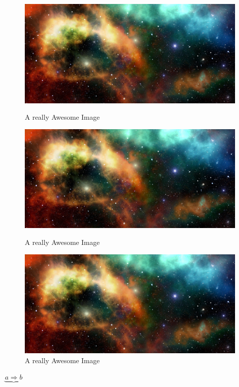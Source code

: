 \documentclass[a4paper,twoside]{report}
\begin{document}
\begin{figure}[!htb]
  \includegraphics[width=\linewidth]{Rplot}
  \caption{A really Awesome Image}\label{fig:awesome_image1}
\endminipage\hfill
{}
  \includegraphics[width=\linewidth]{Rplot}
  \caption{A really Awesome Image}\label{fig:awesome_image2}
\endminipage\hfill
{}%
  \includegraphics[width=\linewidth]{Rplot}
  \caption{A really Awesome Image}\label{fig:awesome_image3}
\endminipage
\end{figure}


$\underbrace{a\Rightarrow b}$
\end{document}
